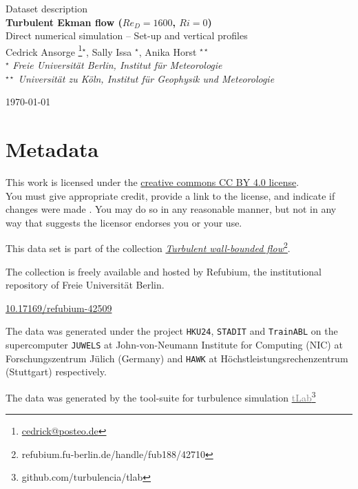 \documentclass[11pt]{article}
\date{\nodate}
\makeatletter
\newcommand{\dstitle}{Turbulent Ekman flow ($Re_D=1600$, $Ri=0$)}
\newcommand{\subtitle}{Direct numerical simulation -- Set-up and vertical profiles}
\newcommand{\doi}{10.17169/refubium-42509}
\newcommand{\tlabName}{\textcolor{gray}{tLab}}
\newcommand{\authors}{
    Cedrick Ansorge \footnote{\href{mailto:cedrick@posteo.de}{cedrick@posteo.de}}$^\star$, \hspace{0.05cm}  
    Sally Issa $^\star$\hspace{0.05cm},
    Anika Horst $^{\star\star}$ \\[0.5em]
    {\small \light{$^\star$ \emph{ Freie Universit\"at Berlin, Institut f\"ur Meteorologie} \\
    $^{\star\star}$ \emph{Universit\"at zu K\"oln, Institut f\"ur Geophysik und Meteorologie}}}
}
\newcommand{\light}[1]{\textcolor{black!80}{#1}}
\newcommand{\printdoi}[1]{\href{https://dx.doi.org/#1}{#1}}
\makeatother
\begin{document}
{ \selectfont
\begin{centering}

 \light{\large Dataset description} \\[1em] 
 {\LARGE \bfseries \sffamily\dstitle} \\[1em]
 \light{\large\subtitle} \\[1em]
 \authors\\ 
\end{centering}
\light{\hfill \today}
}


\section{Metadata}
\begin{description}
\sffamily
\item[\textcopyright] This work is licensed under the \href{https://creativecommons.org/licenses/by/4.0}{creative commons CC BY 4.0 license}. \\ {\small\light{You must give appropriate credit, provide a link to the license, and indicate if changes were made . You may do so in any reasonable manner, but not in any way that suggests the licensor endorses you or your use. }}
\item[\sffamily Collection] This data set is part of the collection \href{https://refubium.fu-berlin.de/handle/fub188/42710}{\emph{Turbulent wall-bounded flow}\footnote{\url{refubium.fu-berlin.de/handle/fub188/42710}}}.

{\small \light{The collection is freely available and hosted by Refubium, the  institutional repository of Freie Universit\"at Berlin.}}

\item[\sffamily DOI]\printdoi{\doi}
\item[\sffamily HPC systems] The data was generated under the project \texttt{HKU24}, \texttt{STADIT} and \texttt{TrainABL} on the supercomputer \texttt{JUWELS} at John-von-Neumann Institute for Computing (NIC) at Forschungszentrum J\"ulich (Germany) and \texttt{HAWK} at Höchstleistungsrechenzentrum (Stuttgart)  respectively. 
\item[\sffamily Code] The data was generated by the tool-suite for turbulence simulation \href{https://github.com/turbulencia/tlab}{\tlabName\footnote{\url{github.com/turbulencia/tlab}}}
\end{description}
\end{document}
